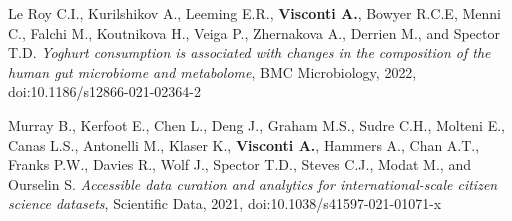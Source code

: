 {\begin{itemize}
	   Le Roy C.I., Kurilshikov A., Leeming E.R., \textbf{Visconti A.}, Bowyer R.C.E, Menni C., Falchi M., Koutnikova H., Veiga P., Zhernakova A., Derrien M., and Spector T.D. \emph{Yoghurt consumption is associated with changes in the composition of the human gut microbiome and metabolome}, BMC Microbiology, 2022, doi:10.1186/s12866-021-02364-2	
		
		 Murray B., Kerfoot E., Chen L., Deng J., Graham M.S., Sudre C.H., Molteni E., Canas L.S., Antonelli M., Klaser K., \textbf{Visconti A.}, Hammers A., Chan A.T., Franks P.W., Davies R., Wolf J., Spector T.D., Steves C.J., Modat M., and Ourselin S. \emph{Accessible data curation and analytics for international-scale citizen science datasets}, Scientific Data, 2021, doi:10.1038/s41597-021-01071-x 
		
	\end{itemize}
}


